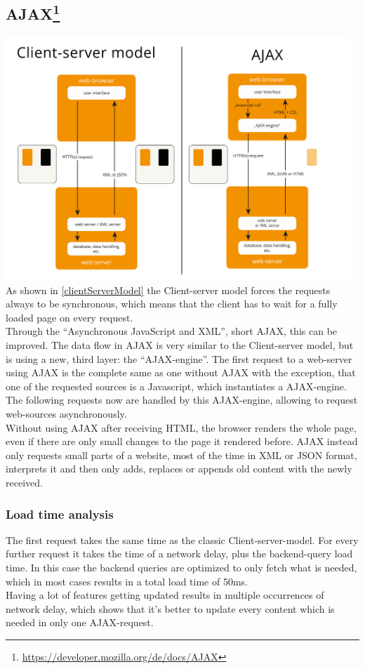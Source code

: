 \documentclass[f,bachelor,binding,twoside,palatino]{WeSTthesis}
\def \ajax {AJAX}
\begin{document}
    
  \subsection[\ajax]{\ajax{}\footnote{\url{https://developer.mozilla.org/de/docs/AJAX}}\label{ajax}}
    \includegraphics[width=13cm]{images/client_server_vs_ajax}\\
    As shown in \ref{clientServerModel} the Client-server model forces the requests always to be synchronous, which means that the client has to wait for a fully loaded page on every request.\\
    Through the \enquote{Asynchronous JavaScript and XML}, short \ajax{}, this can be improved.
    The data flow in AJAX is very similar to the Client-server model, but is using a new, third layer: the \enquote{\ajax{}-engine}.
    The first request to a web-server using \ajax{} is the complete same as one without \ajax{} with the exception, that one of the requested sources is a Javascript, which instantiates a \ajax{}-engine.
    The following requests now are handled by this \ajax{}-engine, allowing to request web-sources asynchronously.\\
    Without using \ajax{} after receiving HTML, the browser renders the whole page, even if there are only small changes to the page it rendered before. \ajax{} instead only requests small parts of a website, most of the time in XML or JSON format, interprets it and then only adds, replaces or appends old content with the newly received.
    \subsubsection{Load time analysis}
      The first request takes the same time as the classic Client-server-model.
      For every further request it takes the time of a network delay, plus the backend-query load time.
      In this case the backend queries are optimized to only fetch what is needed, which in most cases results in a total load time of 50ms.\\
      Having a lot of features getting updated results in multiple occurrences of network delay, which shows that it's better to update every content which is needed in only one \ajax{}-request.
    
\end{document}
